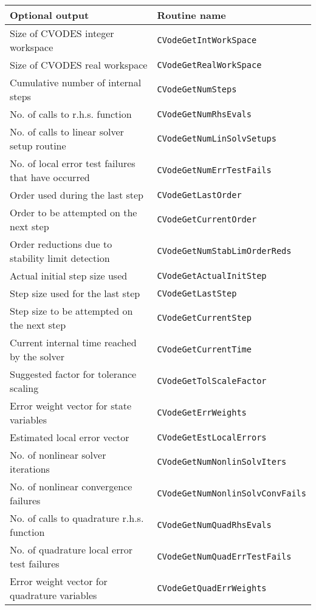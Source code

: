 \begin{acmtable}{\textwidth}
\centering
\begin{tabularx}{\textwidth}{ll}
{\bf Optional output} & {\bf Routine name} \\
\hline
Size of CVODES integer workspace & {\tt CVodeGetIntWorkSpace} \\
Size of CVODES real workspace & {\tt CVodeGetRealWorkSpace} \\
Cumulative number of internal steps & {\tt CVodeGetNumSteps} \\
No. of calls to r.h.s. function & {\tt CVodeGetNumRhsEvals} \\
No. of calls to linear solver setup routine & {\tt CVodeGetNumLinSolvSetups} \\
No. of local error test failures that have occurred & {\tt CVodeGetNumErrTestFails} \\
Order used during the last step & {\tt CVodeGetLastOrder} \\
Order to be attempted on the next step & {\tt CVodeGetCurrentOrder} \\
Order reductions due to stability limit detection & {\tt CVodeGetNumStabLimOrderReds} \\
Actual initial step size used & {\tt CVodeGetActualInitStep} \\
Step size used for the last step & {\tt CVodeGetLastStep} \\
Step size to be attempted on the next step & {\tt CVodeGetCurrentStep} \\
Current internal time reached by the solver & {\tt CVodeGetCurrentTime} \\
Suggested factor for tolerance scaling  & {\tt CVodeGetTolScaleFactor} \\
Error weight vector for state variables & {\tt CVodeGetErrWeights} \\
Estimated local error vector & {\tt CVodeGetEstLocalErrors} \\
No. of nonlinear solver iterations & {\tt CVodeGetNumNonlinSolvIters} \\
No. of nonlinear convergence failures & {\tt CVodeGetNumNonlinSolvConvFails} \\
No. of calls to quadrature r.h.s. function & {\tt CVodeGetNumQuadRhsEvals} \\
No. of quadrature local error test failures & {\tt CVodeGetNumQuadErrTestFails} \\
Error weight vector for quadrature variables & {\tt CVodeGetQuadErrWeights} \\

\end{tabularx}
\end{acmtable}
